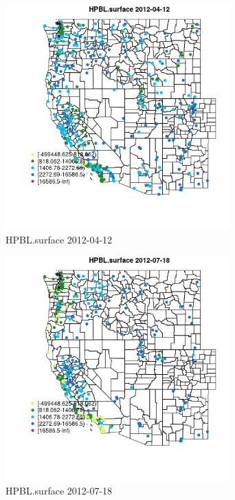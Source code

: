 \begin{figure} 
\centering  
\includegraphics[width=0.77\textwidth]{Code_Outputs/Report_ML_input_PM25_Step4_part_e_de_duplicated_aves_compiled_2019-05-14wNAs_MapObsHPBLsurface2012-04-12.jpg} 
\caption{\label{fig:Report_ML_input_PM25_Step4_part_e_de_duplicated_aves_compiled_2019-05-14wNAsMapObsHPBLsurface2012-04-12}HPBL.surface 2012-04-12} 
\end{figure} 
 

\begin{figure} 
\centering  
\includegraphics[width=0.77\textwidth]{Code_Outputs/Report_ML_input_PM25_Step4_part_e_de_duplicated_aves_compiled_2019-05-14wNAs_MapObsHPBLsurface2012-07-18.jpg} 
\caption{\label{fig:Report_ML_input_PM25_Step4_part_e_de_duplicated_aves_compiled_2019-05-14wNAsMapObsHPBLsurface2012-07-18}HPBL.surface 2012-07-18} 
\end{figure} 
 

